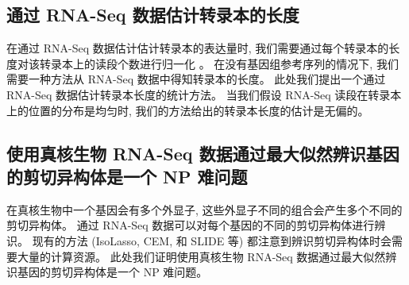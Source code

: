 \subsection{通过 RNA-Seq 数据估计转录本的长度}
在通过 RNA-Seq 数据估计估计转录本的表达量时, 
我们需要通过每个转录本的长度对该转录本上的读段个数进行归一化 
\cite{mortazavi2008mapping, Jiang15042009, cufflinks.2010}。
在没有基因组参考序列的情况下, 我们需要一种方法从 RNA-Seq 数据中得知转录本的长度。
此处我们提出一个通过 RNA-Seq 数据估计转录本长度的统计方法。
当我们假设 RNA-Seq 读段在转录本上的位置的分布是均匀时, 
我们的方法给出的转录本长度的估计是无偏的。

\subsection{使用真核生物 RNA-Seq 数据通过最大似然辨识基因的剪切异构体是一个 NP 难问题}
在真核生物中一个基因会有多个外显子, 这些外显子不同的组合会产生多个不同的剪切异构体。
通过 RNA-Seq 数据可以对每个基因的不同的剪切异构体进行辨识。
现有的方法 (IsoLasso, CEM, 和 SLIDE 等) 都注意到辨识剪切异构体时会需要大量的计算资源。
此处我们证明使用真核生物 RNA-Seq 数据通过最大似然辨识基因的剪切异构体是一个 NP 难问题。





